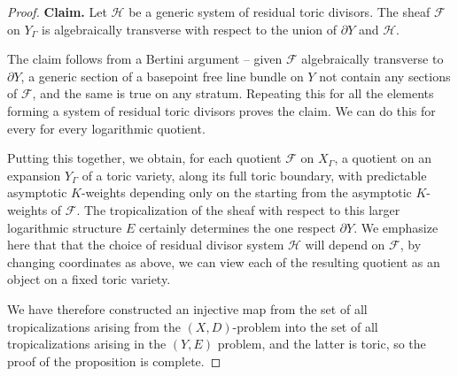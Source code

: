 \documentclass[10pt,a4paper]{amsart}
\begin{document}
\begin{proof}
\noindent
{\bf Claim.} Let $\mathcal H$ be a generic system of residual toric divisors. The sheaf $\mathcal F$ on $Y_\Gamma$ is algebraically transverse with respect to the union of $\partial Y$ and $\mathcal H$. 

The claim follows from a Bertini argument -- given $\mathcal F$ algebraically transverse to $\partial Y$, a generic section of a basepoint free line bundle on $Y$ not contain any sections of $\mathcal F$, and the same is true on any stratum. Repeating this for all the elements forming a system of residual toric divisors proves the claim. We can do this for every for every logarithmic quotient. 

Putting this together, we obtain, for each quotient $\mathcal F$ on $X_\Gamma$, a quotient on an expansion $Y_\Gamma$ of a toric variety, along its full toric boundary, with predictable asymptotic $K$-weights depending only on the starting from the asymptotic $K$-weights of $\mathcal F$. The tropicalization of the sheaf with respect to this larger logarithmic structure $E$ certainly determines the one respect $\partial Y$. We emphasize here that that the choice of residual divisor system $\mathcal H$ will depend on $\mathcal F$, by changing coordinates as above, we can view each of the resulting quotient as an object on a fixed toric variety. 

We have therefore constructed an injective map from the set of all tropicalizations arising from the $(X,D)$-problem into the set of all tropicalizations arising in the $(Y,E)$ problem, and the latter is toric, so the proof of the proposition is complete. 
\end{proof}
\end{document}
